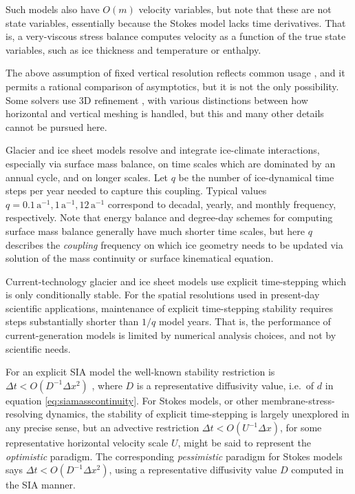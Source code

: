 \documentclass[review,letterpaper]{igs}
\begin{document}
Such models also have $O(m)$ velocity variables, but note that these are not state variables, essentially because the Stokes model lacks time derivatives.  That is, a very-viscous stress balance computes velocity as a function of the true state variables, such as ice thickness and temperature or enthalpy.

The above assumption of fixed vertical resolution reflects common usage \citep[for example]{Aschwandenetal2019,BrinkerhoffJohnson2015,Hoffmanetal2018,Lengetal2012,
Winkelmannetal2011}, and it permits a rational comparison of asymptotics, but it is not the only possibility.  Some solvers use 3D refinement \citep{BrownSmithAhmadia2013,IsaacStadlerGhattas2015,Tuminaroetal2016}, with various distinctions between how horizontal and vertical meshing is handled, but this and many other details cannot be pursued here.

Glacier and ice sheet models resolve and integrate ice-climate interactions, especially via surface mass balance, on time scales which are dominated by an annual cycle, and on longer scales.  Let $q$ be the number of ice-dynamical time steps per year needed to capture this coupling.  Typical values $q=0.1 \,\text{a}^{-1}, 1 \,\text{a}^{-1}, 12 \,\text{a}^{-1}$ correspond to decadal, yearly, and monthly frequency, respectively.  Note that energy balance and degree-day schemes for computing surface mass balance \citep{GreveBlatter2009} generally have much shorter time scales, but here $q$ describes the \emph{coupling} frequency on which ice geometry needs to be updated via solution of the mass continuity or surface kinematical equation.

Current-technology glacier and ice sheet models use explicit time-stepping which is only conditionally stable.  For the spatial resolutions used in present-day scientific applications, maintenance of explicit time-stepping stability requires steps substantially shorter than $1/q$ model years.  That is, the performance of current-generation models is limited by numerical analysis choices, and not by scientific needs.

For an explicit SIA model the well-known stability restriction is $\Delta t < O(D^{-1} \Delta x^2)$ \citep{Bueleretal2005,HindmarshPayne1996}, where $D$ is a representative diffusivity value, i.e.~of $d$ in equation \eqref{eq:siamasscontinuity}.  For Stokes models, or other membrane-stress-resolving dynamics, the stability of explicit time-stepping is largely unexplored in any precise sense, but an advective restriction $\Delta t < O(U^{-1} \Delta x)$, for some representative horizontal velocity scale $U$, might be said to represent the \emph{optimistic} paradigm.  The corresponding \emph{pessimistic} paradigm for Stokes models says $\Delta t < O(D^{-1} \Delta x^2)$, using a representative diffusivity value $D$ computed in the SIA manner.
\end{document}
